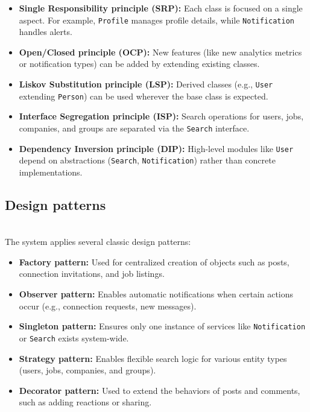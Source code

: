 \begin{itemize}
\item
\protect{}\label{nFliQXEYRCBIrk-DjsYAe}
\textbf{Single Responsibility principle (SRP):} Each class is focused on a single aspect. For example, \texttt{Profile} manages profile details, while \texttt{Notification} handles alerts.
\item
\protect{}\label{tSc4cAFNWtWJTXLMPUdzL}
\textbf{Open/Closed principle (OCP):} New features (like new analytics metrics or notification types) can be added by extending existing classes.
\item
\protect{}\label{LLPZ0-IeqyvDaxDt8nvm8}
\textbf{Liskov Substitution principle (LSP):} Derived classes (e.g., \texttt{User} extending \texttt{Person}) can be used wherever the base class is expected.
\item
\protect{}\label{8Fiqr5kNY2daj47U3V2j7}
\textbf{Interface Segregation principle (ISP):} Search operations for users, jobs, companies, and groups are separated via the \texttt{Search} interface.
\item
\protect{}\label{VpfSlmbtLNSC6Y9VcNhBs}
\textbf{Dependency Inversion principle (DIP):} High-level modules like \texttt{User} depend on abstractions (\texttt{Search}, \texttt{Notification}) rather than concrete implementations.
\end{itemize}

\subsection{Design patterns}\label{90r3IwBIObnbYKgPLlahv}
\\
The system applies several classic design patterns:

\begin{itemize}
\item
\protect{}\label{OwwJ8hw8TSfuwp7n3ply0}
\textbf{Factory pattern:} Used for centralized creation of objects such as posts, connection invitations, and job listings.
\item
\protect{}\label{FG9mQxDjOnckNLK0grgI4}
\textbf{Observer pattern:} Enables automatic notifications when certain actions occur (e.g., connection requests, new messages).
\item
\protect{}\label{_8c8b9t4JkWYH_As2vKOa}
\textbf{Singleton pattern:} Ensures only one instance of services like \texttt{Notification} or \texttt{Search} exists system-wide.
\item
\protect{}\label{BFrgkLHcICA88fgYYEypc}
\textbf{Strategy pattern:} Enables flexible search logic for various entity types (users, jobs, companies, and groups).
\item
\protect{}\label{Vjn8jRrebgT9ujVkpVy7K}
\textbf{Decorator pattern:} Used to extend the behaviors of posts and comments, such as adding reactions or sharing.
\end{itemize}

